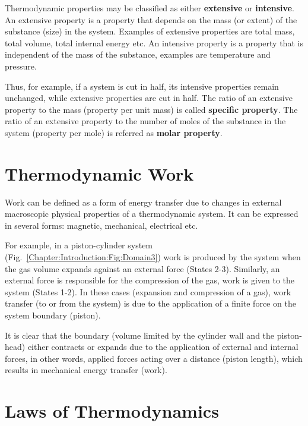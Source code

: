    Thermodynamic properties may be classified as either {\bf extensive} or {\bf intensive}. An extensive property is a property that depends on the mass (or extent) of the substance (\ie size) in the system. Examples of extensive properties are total mass, total volume, total internal energy etc. An intensive property is a property that is independent of the mass of the substance, examples are temperature and pressure.

   Thus, for example, if a system is cut in half, its intensive properties remain unchanged, while extensive properties are cut in half. The ratio of an extensive property to the mass (\ie property per unit mass) is called {\bf specific property}. The ratio of an extensive property to the number of moles of the substance in the system (\ie property per mole) is referred as {\bf molar property}.

   
\section{Thermodynamic Work}\label{Chapter:Introduction:Section:ThermodynamicWork}
   Work can be defined as a form of energy transfer due to changes in external macroscopic physical properties of a thermodynamic system. It can be expressed in several forms: magnetic, mechanical, electrical etc.

   For example, in a piston-cylinder system (Fig.~\ref{Chapter:Introduction:Fig:Domain3}) work is produced by the system when the gas volume expands against an external force (States 2-3). Similarly, an external force is responsible for the compression of the gas, \ie work is given to the system (States 1-2). In these cases (expansion and compression of a gas), work transfer (to or from the system) is due to the application of a finite force on the system boundary (piston).

   It is clear that the boundary (volume limited by the cylinder wall and the piston-head) either contracts or expands due to the application of external and internal forces, \ie in other words, applied forces acting over a distance (piston length), which results in mechanical energy transfer (\ie work).



\section{Laws of Thermodynamics}\label{Chapter:Introduction:Section:LawsThermodynamics}

